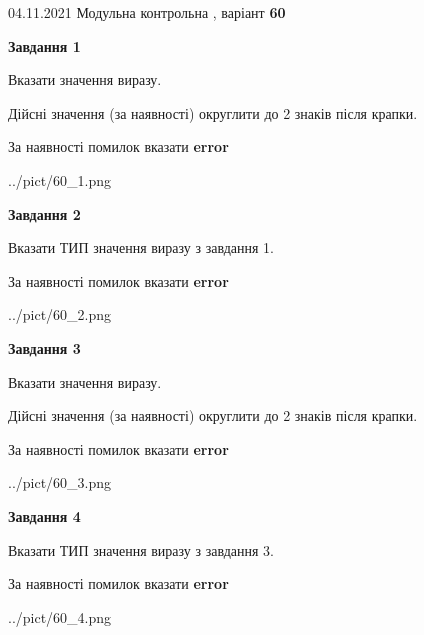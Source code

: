 \documentclass[11pt, ukrainian]{article}
\begin{document}
{04.11.2021 Модульна контрольна , варіант  \No \textbf { 60 }\par}
{
\begin {large}
{\begin {center}\textbf{Завдання 1}\end {center}}\par
Вказати значення виразу. \par
Дійсні значення (за наявності) округлити до 2 знаків після крапки. \par
За наявності помилок вказати \textbf{error}

\begin{center}
	{../pict/60_1.png}
\end{center}
\newpage

{\begin {center}\textbf{Завдання 2}\end {center}}\par
Вказати ТИП значення виразу з завдання 1. \par
За наявності помилок вказати \textbf{error}

\begin{center}
	{../pict/60_2.png}
\end{center}
\newpage

{\begin {center}\textbf{Завдання 3}\end {center}}\par
Вказати значення виразу. \par
Дійсні значення (за наявності) округлити до 2 знаків після крапки. \par
За наявності помилок вказати \textbf{error}

\begin{center}
	{../pict/60_3.png}
\end{center}
\newpage

{\begin {center}\textbf{Завдання 4}\end {center}}\par
Вказати ТИП значення виразу з завдання 3. \par
За наявності помилок вказати \textbf{error}

\begin{center}
	{../pict/60_4.png}
\end{center}
\newpage


\end{large}}
\end{document}
